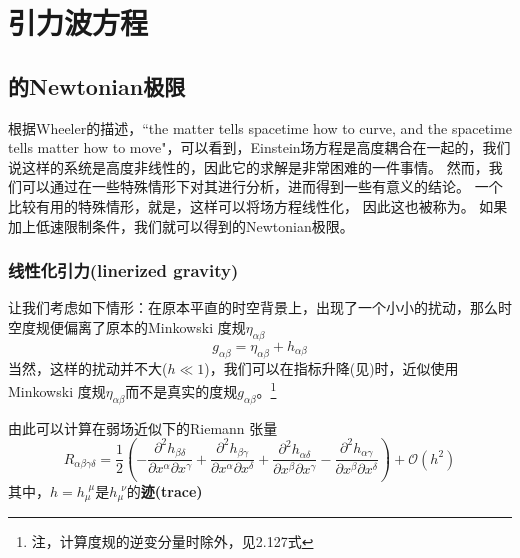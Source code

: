 
\chapter{引力波方程}
\label{chap2}

\section{\GR 的Newtonian极限}
根据Wheeler的描述，``the matter tells spacetime how to curve, and the spacetime tells matter how to move"，可以看到，Einstein场方程是高度耦合在一起的，我们说这样的系统是高度非线性的，因此它的求解是非常困难的一件事情。
然而，我们可以通过在一些特殊情形下对其进行分析，进而得到一些有意义的结论。
一个比较有用的特殊情形，就是{}，这样可以将场方程线性化， 因此这也被称为{}。
如果加上低速限制条件，我们就可以得到\GR 的Newtonian极限。

\subsection{线性化引力(linerized gravity)}\label{sec:LinGrav}
让我们考虑如下情形：在原本平直的时空背景上，出现了一个小小的扰动，那么时空度规便偏离了原本的Minkowski 度规$\eta_{\alpha\beta}$
\begin{equation}\label{eq:LinearMetric} 
  g_{\alpha\beta}=  \eta _{\alpha\beta} + h_{\alpha\beta}
\end{equation}
当然，这样的扰动并不大($h \ll 1$)，我们可以在指标升降(见)时，近似使用Minkowski 度规$\eta _{\alpha\beta}$而不是真实的度规$g_{\alpha\beta}$。\footnote{注，计算度规的逆变分量时除外，见\cite{Creighton2011}2.127式}

由此可以计算在弱场近似下的Riemann 张量
\begin{equation}\label{eq:RiemannTensorLin}
  R_{\alpha\beta\gamma\delta}= \frac{1}{2}\left(- \frac{\partial^2 h_{\beta\delta}}{\partial x^\alpha \partial x^\gamma} + \frac{\partial^2 h_{\beta\gamma}}{\partial x^\alpha \partial x^\delta} + \frac{\partial^2 h_{\alpha\delta}}{\partial x^\beta \partial x^\gamma} - \frac{\partial^2 h_{\alpha\gamma}}{\partial x^\beta \partial x^\delta}  \right) + \mathcal{O}(h^2)
\end{equation}
其中，$h = h_\mu^{\,~\mu}$是$h_\mu^{\,~\nu}$的{\textbf{迹(trace)}}

